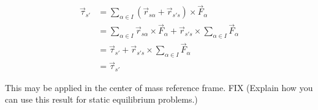 \documentclass{esg8012pset}
\begin{document}
\begin{solution}
\begin{enumerate}[(a)]
\begin{align*}
    \vec \tau_{s'} & = \sum_{\alpha\in I}(\vec r_{s\alpha} + \vec r_{s's}) \times \vec F_\alpha \\
    & = \sum_{\alpha\in I}\vec r_{s\alpha} \times \vec F_\alpha + \vec r_{s's} \times \sum_{\alpha\in I} \vec F_\alpha \\
    & = \vec \tau_{s'} + \vec r_{s's} \times \sum_{\alpha\in I} \vec F_\alpha \\
    & = \vec \tau_{s'}
    \end{align*} \par
    This may be applied in the center of mass reference frame. FIX (Explain how you can use this result for static equilibrium problems.)
  \end{enumerate}
\end{solution}
\end{document}
